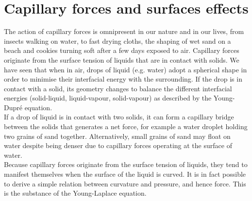 \documentclass[a4paper, 11pt, normalem]{report}
\begin{document}
\section{Capillary forces and surfaces effects}
The action of capillary forces is omnipresent in our nature and in our lives, from insects walking on water, to fast drying cloths, the shaping of wet sand on a beach and cookies turning soft after a few days exposed to air.
Capillary forces originate from the surface tension of liquids that are in contact with solids.
We have seen that when in air, drops of liquid (e.g. water) adopt a spherical shape in order to minimise their interfacial energy with the surrounding.
If the drop is in contact with a solid, its geometry changes to balance the different interfacial energies (solid-liquid, liquid-vapour, solid-vapour) as described by the Young-Dupr\'{e} equation. \\
If a drop of liquid is in contact with two solids, it can form a capillary bridge between the solids that generates a net force, for example a water droplet holding two grains of sand together.
Alternatively, small grains of sand may float on water despite being denser due to capillary forces operating at the surface of water. \\
Because capillary forces originate from the surface tension of liquids, they tend to manifest themselves when the surface of the liquid is curved.
It is in fact possible to derive a simple relation between curvature and pressure, and hence force.
This is the substance of the Young-Laplace equation.
\end{document}
